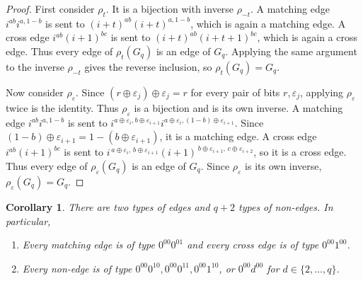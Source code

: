 \documentclass[11pt]{article}
\newtheorem{corollary}[theorem]{Corollary}
\theoremstyle{definition}
\theoremstyle{remark}
\begin{document}
\begin{proof}
First consider $\rho_t$. 
It is a bijection with inverse $\rho_{-t}$.
A matching edge $i^{ab}i^{a,1-b}$ is sent to $(i+t)^{ab}(i+t)^{a,1-b}$, which is again a matching edge.  
A cross edge $i^{ab}(i+1)^{bc}$ is sent to $(i+t)^{ab}(i+t+1)^{bc}$, which is again a cross edge.  
Thus every edge of $\rho_t(G_q)$ is an edge of $G_q$.  
Applying the same argument to the inverse $\rho_{-t}$ gives the reverse inclusion, so $\rho_t(G_q)=G_q$.

Now consider $\rho_\varepsilon$. 
Since $(r\oplus\varepsilon_j)\oplus\varepsilon_j=r$ for every pair of bits $r,\varepsilon_j$, applying
$\rho_\varepsilon$ twice is the identity. 
Thus $\rho_\varepsilon$ is a bijection and is its own inverse.
A matching edge $i^{ab}i^{a,1-b}$ is sent to $i^{a\oplus\varepsilon_i, b\oplus\varepsilon_{i+1}}i^{a\oplus\varepsilon_i,(1-b)\oplus\varepsilon_{i+1}}$.
Since $(1-b)\oplus\varepsilon_{i+1}=1-(b\oplus\varepsilon_{i+1})$, it is a matching edge.
A cross edge $i^{ab}(i+1)^{bc}$ is sent to $i^{\,a\oplus\varepsilon_i,\,b\oplus\varepsilon_{i+1}}(i+1)^{\,b\oplus\varepsilon_{i+1},\,c\oplus\varepsilon_{i+2}}$, so it is a cross edge.
Thus every edge of $\rho_\varepsilon(G_q)$ is an edge of $G_q$.  
Since $\rho_\varepsilon$ is its own inverse, $\rho_\varepsilon(G_q)=G_q$.
\end{proof}

\begin{corollary}
\label{cor:normalization}
There are two types of edges and $q+2$ types of non-edges. 
In particular, 
\begin{enumerate}
\item Every matching edge is of type $0^{00}0^{01}$ and every cross edge is of type $0^{00}1^{00}$.
\item Every non-edge is of type $0^{00}0^{10}, 0^{00}0^{11},  0^{00}1^{10}$, or $0^{00}d^{00}$ for $d\in\{2, \ldots, q\}$.
\end{enumerate}
\end{corollary}
\end{document}
